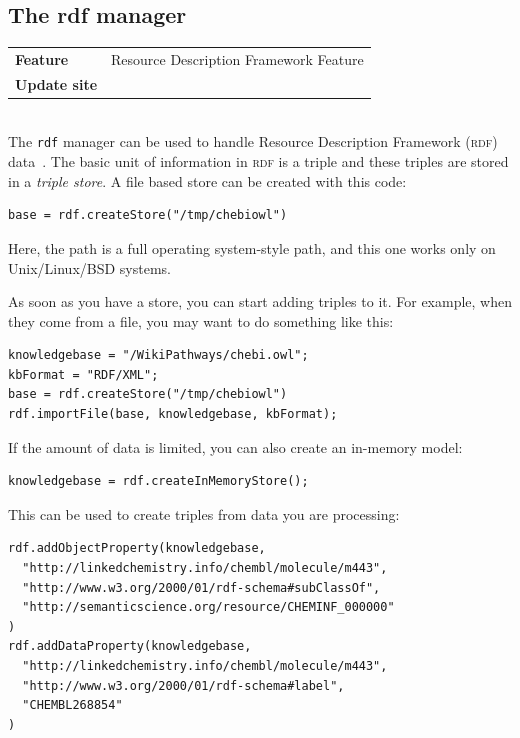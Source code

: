 \documentclass[a5paper, 10pt]{memoir}
\begin{document}
\begin{refsection}

\section{The rdf manager}

\begin{tabular}{ll}
\textbf{Feature} & Resource Description Framework Feature \\
\textbf{Update site} & \url{} \\
\end{tabular} \\

\noindent
The \texttt{rdf} manager can be used to handle Resource Description Framework
(\textsc{rdf}) data~\cite{willighagen2011linking}. The basic unit of
information in \textsc{rdf} is a triple and these triples are stored in a
\emph{triple store}. A file based store can be created with this
code:

\begin{Verbatim}
base = rdf.createStore("/tmp/chebiowl")
\end{Verbatim}
Here, the path is a full operating system-style path, and this one works only
on Unix/Linux/BSD systems.

As soon as you have a store, you can start adding triples to it. For example,
when they come from a file, you may want to do something like
this:

\begin{Verbatim}
knowledgebase = "/WikiPathways/chebi.owl";
kbFormat = "RDF/XML";
base = rdf.createStore("/tmp/chebiowl")
rdf.importFile(base, knowledgebase, kbFormat);
\end{Verbatim}
If the amount of data is limited, you can also create an
in-memory model:

\begin{Verbatim}
knowledgebase = rdf.createInMemoryStore();
\end{Verbatim}
This can be used to create triples from data you are
processing:

\begin{Verbatim}
rdf.addObjectProperty(knowledgebase,
  "http://linkedchemistry.info/chembl/molecule/m443",
  "http://www.w3.org/2000/01/rdf-schema#subClassOf",
  "http://semanticscience.org/resource/CHEMINF_000000"
)
rdf.addDataProperty(knowledgebase,
  "http://linkedchemistry.info/chembl/molecule/m443",
  "http://www.w3.org/2000/01/rdf-schema#label",
  "CHEMBL268854"
)
\end{Verbatim}


\end{refsection}
\end{document}
